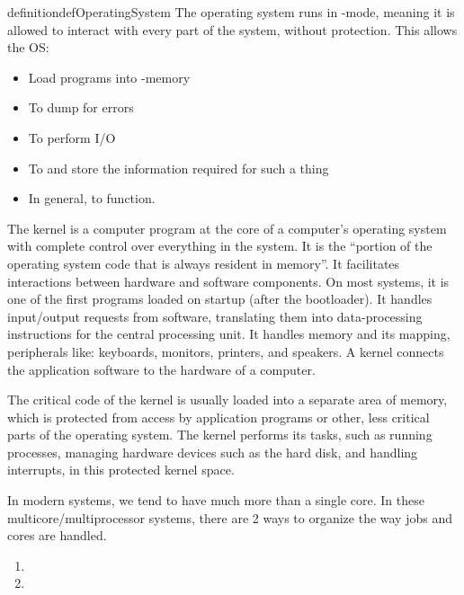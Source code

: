 \begin{restatable}{definition}{defOperatingSystem}
  The operating system runs in -mode, meaning it is allowed to interact with every part of the system, without protection.
  This allows the OS:\@
  \begin{itemize}[noitemsep]
  \item Load  programs into -memory
  \item To dump for errors
  \item To perform I/O
  \item To  and store the information required for such a thing
  \item In general, to function.
  \end{itemize}
\end{restatable}

\begin{definition}[Kernel]\label{def:Kernel}
  The kernel is a computer program at the core of a computer's operating system with complete control over everything in the system.
  It is the ``portion of the operating system code that is always resident in memory''.
  It facilitates interactions between hardware and software components.
  On most systems, it is one of the first programs loaded on startup (after the bootloader).
  It handles input/output requests from software, translating them into data-processing instructions for the central processing unit.
  It handles memory and its mapping, peripherals like: keyboards, monitors, printers, and speakers.
  A kernel connects the application software to the hardware of a computer.

  The critical code of the kernel is usually loaded into a separate area of memory, which is protected from access by application programs or other, less critical parts of the operating system.
  The kernel performs its tasks, such as running processes, managing hardware devices such as the hard disk, and handling interrupts, in this protected kernel space.
\end{definition}

In modern systems, we tend to have much more than a single  core.
In these multicore/multiprocessor systems, there are 2 ways to organize the way jobs and cores are handled.
\begin{enumerate}[noitemsep]
\item {}
\item {}
\end{enumerate}

